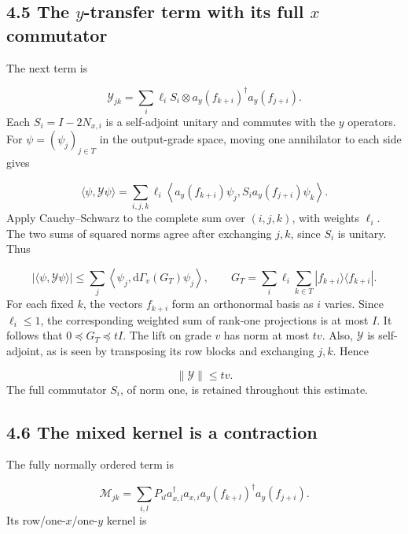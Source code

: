 \documentclass[11pt,a4paper]{article}
\begin{document}
\subsection*{4.5 The \(y\)-transfer term with its full \(x\) commutator}
The next term is

\begin{equation}
\mathcal Y_{jk}
=\sum_i\ell_i S_i\otimes
a_y(f_{k+i})^\dagger a_y(f_{j+i}).
\tag{4.14}
\end{equation}
Each \(S_i=I-2N_{x,i}\) is a self-adjoint unitary and commutes with the \(y\) operators. For \(\psi=(\psi_j)_{j\in T}\) in the output-grade space, moving one annihilator to each side gives

\begin{equation}
\langle\psi,\mathcal Y\psi\rangle
=\sum_{i,j,k}\ell_i
\left\langle a_y(f_{k+i})\psi_j,
S_i a_y(f_{j+i})\psi_k\right\rangle.
\tag{4.15}
\end{equation}
Apply Cauchy--Schwarz to the complete sum over \((i,j,k)\), with weights \(\ell_i\). The two sums of squared norms agree after exchanging \(j,k\), since \(S_i\) is unitary. Thus

\begin{equation}
|\langle\psi,\mathcal Y\psi\rangle|
\le\sum_j\left\langle\psi_j,
\mathrm d\Gamma_v(G_T)\psi_j\right\rangle,
\qquad
G_T=\sum_i\ell_i\sum_{k\in T}|f_{k+i}\rangle\langle f_{k+i}|.
\tag{4.16}
\end{equation}
For each fixed \(k\), the vectors \(f_{k+i}\) form an orthonormal basis as \(i\) varies. Since \(\ell_i\le1\), the corresponding weighted sum of rank-one projections is at most \(I\). It follows that \(0\preceq G_T\preceq tI\). The lift on grade \(v\) has norm at most \(tv\). Also, \(\mathcal Y\) is self-adjoint, as is seen by transposing its row blocks and exchanging \(j,k\). Hence

\begin{equation}
\|\mathcal Y\|\le tv.
\tag{4.17}
\end{equation}
The full commutator \(S_i\), of norm one, is retained throughout this estimate.

\subsection*{4.6 The mixed kernel is a contraction}
The fully normally ordered term is

\begin{equation}
\mathcal M_{jk}=\sum_{i,l}P_{il}
a_{x,l}^\dagger a_{x,i}
a_y(f_{k+l})^\dagger a_y(f_{j+i}).
\tag{4.18}
\end{equation}
Its row/one-\(x\)/one-\(y\) kernel is
\end{document}
